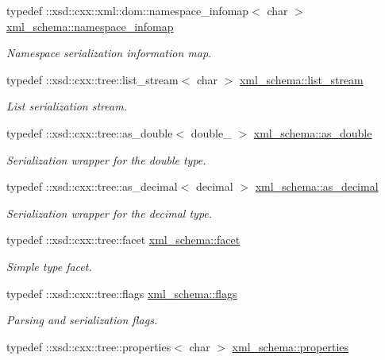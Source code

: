\begin{DoxyCompactItemize}
typedef \+::xsd\+::cxx\+::xml\+::dom\+::namespace\+\_\+infomap$<$ char $>$ \hyperlink{namespacexml__schema_ad52b6e3505153cb30ba3452f7868450e}{xml\+\_\+schema\+::namespace\+\_\+infomap}
\begin{DoxyCompactList}\small\item\em Namespace serialization information map. \end{DoxyCompactList}\item 
typedef \+::xsd\+::cxx\+::tree\+::list\+\_\+stream$<$ char $>$ \hyperlink{namespacexml__schema_ab6c818ac91e70a25620375e0d000be83}{xml\+\_\+schema\+::list\+\_\+stream}
\begin{DoxyCompactList}\small\item\em List serialization stream. \end{DoxyCompactList}\item 
typedef \+::xsd\+::cxx\+::tree\+::as\+\_\+double$<$ double\+\_\+ $>$ \hyperlink{namespacexml__schema_ae0eab1db5641db3b286a63a0ebe40351}{xml\+\_\+schema\+::as\+\_\+double}
\begin{DoxyCompactList}\small\item\em Serialization wrapper for the double type. \end{DoxyCompactList}\item 
typedef \+::xsd\+::cxx\+::tree\+::as\+\_\+decimal$<$ decimal $>$ \hyperlink{namespacexml__schema_a60dfdca63dedf12d8a524c0496def693}{xml\+\_\+schema\+::as\+\_\+decimal}
\begin{DoxyCompactList}\small\item\em Serialization wrapper for the decimal type. \end{DoxyCompactList}\item 
typedef \+::xsd\+::cxx\+::tree\+::facet \hyperlink{namespacexml__schema_ae447ddf0dd2470b5a095774e0b359a86}{xml\+\_\+schema\+::facet}
\begin{DoxyCompactList}\small\item\em Simple type facet. \end{DoxyCompactList}\item 
typedef \+::xsd\+::cxx\+::tree\+::flags \hyperlink{namespacexml__schema_a8d981c127a1f5106d04ad5853e707361}{xml\+\_\+schema\+::flags}
\begin{DoxyCompactList}\small\item\em Parsing and serialization flags. \end{DoxyCompactList}\item 
typedef \+::xsd\+::cxx\+::tree\+::properties$<$ char $>$ \hyperlink{namespacexml__schema_aba199bc39c8b21c427369c27d2bcfc8c}{xml\+\_\+schema\+::properties}

\end{DoxyCompactItemize}
